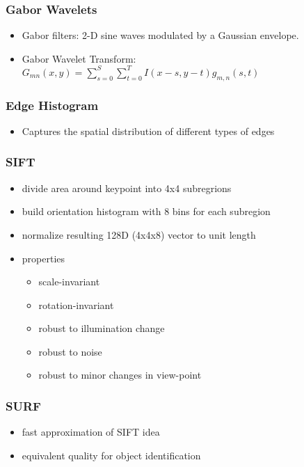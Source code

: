 \documentclass[paper=a4, fontsize=11pt]{scrartcl} %
\numberwithin{equation}{section} %
\numberwithin{figure}{section} %
\numberwithin{table}{section} %
\begin{document}
\subsubsection{Gabor Wavelets}

\begin{itemize}
\item Gabor filters: 2-D sine waves modulated by a Gaussian envelope.
\item Gabor Wavelet Transform: $G_{mn}(x,y) = \sum\limits_{s=0}^S \sum\limits_{t=0}^T I(x-s, y-t) g_{m,n}(s,t)$
\end{itemize}

\subsubsection{Edge Histogram}

\begin{itemize}
\item Captures the spatial distribution of different types of edges
\end{itemize}

\subsubsection{SIFT}

\begin{itemize}
\item divide area around keypoint into 4x4 subregrions
\item build orientation histogram with 8 bins for each subregion
\item normalize resulting 128D (4x4x8) vector to unit length
\item properties
\begin{itemize}
\item scale-invariant
\item rotation-invariant
\item robust to illumination change
\item robust to noise
\item robust to minor changes in view-point
\end{itemize}
\end{itemize}

\subsubsection{SURF}

\begin{itemize}
\item fast approximation of SIFT idea
\item equivalent quality for object identification
\end{itemize}
\end{document}
